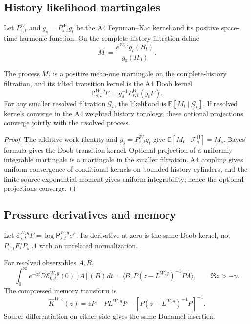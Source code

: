 \subsection{History likelihood martingales}

Let \(P_{s,t}^{W}\) and \(g_s=P_{s,t}^{W}g_t\) be the A4 Feynman--Kac kernel
and its positive space-time harmonic function.  On the complete-history
filtration define
\[
 M_t
 =
 \frac{e^{W_{0,t}}g_t(H_t)}{g_0(H_0)}.
\]

\begin{theorem}
\label{thm:r5-c2-likelihood}
The process \(M_t\) is a positive mean-one martingale on the complete-history
filtration, and its tilted transition kernel is the A4 Doob kernel
\[
 {\mathsf P}_{s,t}^{W,g}F
 =g_s^{-1}P_{s,t}^{W}(g_tF).
\]
For any smaller resolved filtration \({\mathcal G}_t\), the likelihood is
\(\mathbb E[M_t\mid{\mathcal G}_t]\).  If resolved kernels converge in the
A4 weighted history topology, these optional projections converge jointly
with the resolved process.
\end{theorem}

\begin{proof}
The additive work identity and
\(g_s=P_{s,t}^{W}g_t\) give
\(\mathbb E[M_t\mid{\mathcal F}^{\mathsf H}_s]=M_s\).
Bayes' formula gives the Doob transition kernel.  Optional projection of a
uniformly integrable martingale is a martingale in the smaller filtration.
A4 coupling gives uniform convergence of conditional kernels on bounded
history cylinders, and the finite-source exponential moment gives uniform
integrability; hence the optional projections converge.
\end{proof}

\subsection{Pressure derivatives and memory}

Let
\({\mathcal E}^{W,g}_{s,t}F
=\log{\mathsf P}^{W,g}_{s,t}e^F\).  Its derivative at zero is the same Doob
kernel, not \(P_{s,t}F/P_{s,t}1\) with an unrelated normalization.

\begin{theorem}
\label{thm:r5-c2-memory}
For resolved observables \(A,B\),
\[
 \int_0^\infty e^{-zt}
 D{\mathcal E}^{W,g}_{0,t}(0)[A](B)\,dt
 =
 \langle B,P(z-L^{W,g})^{-1}PA\rangle,
 \qquad\Re z>-\gamma.
\]
The compressed memory transform is
\[
 \widehat K^{W,g}(z)
 =zP-PL^{W,g}P-
 [P(z-L^{W,g})^{-1}P]^{-1}.
\]
Source differentiation on either side gives the same Duhamel insertion.
\end{theorem}

